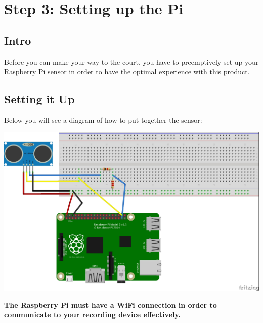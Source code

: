 \chapter{Step 3: Setting up the Pi}

\setlength{\parindent}{0cm}

\section{Intro}
Before you can make your way to the court, you have to preemptively set up your Raspberry Pi sensor in order to have the optimal experience with this product.

\section{Setting it Up}
Below you will see a diagram of how to put together the sensor:
\begin{center}
    \includegraphics[width = 1 \textwidth]{Pieces/Sensor.jpg}
\end{center}

\textbf{The Raspberry Pi must have a WiFi connection in order to communicate to your recording device effectively.}
